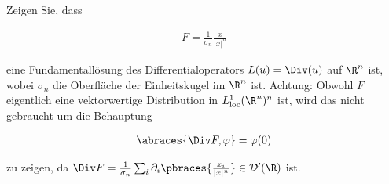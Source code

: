 
\begin{exercise}

Zeigen Sie, dass

\begin{align*}
  F = \frac{1}{\sigma_n}\frac{x}{|x|^n}
\end{align*}

eine Fundamentallösung des Differentialoperators $L(u) = \Div(u)$ auf $\R^n$ ist, wobei $\sigma_n$ die Oberfläche der Einheitskugel im $\R^n$ ist.
Achtung:
Obwohl $F$ eigentlich eine vektorwertige Distribution in $L_{\mathrm{loc}}^1(\R^n)^n$ ist, wird das nicht gebraucht um die Behauptung

\begin{align*}
  \abraces{\Div F, \varphi} = \varphi(0)
\end{align*}

zu zeigen, da $\Div F = \frac{1}{\sigma_n}\sum_{i} \partial_i \pbraces{\frac{x_i}{|x|^n}} \in \mathcal{D}^{\prime}(\R)$ ist.
\end{exercise}


